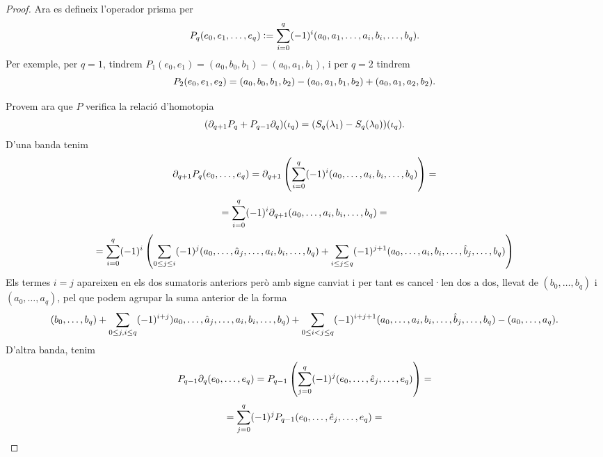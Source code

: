 \documentclass[../main.tex]{subfiles}
\begin{document}
\begin{proof}
Ara es defineix l'operador prisma per 
\begin{equation}
    \notag
    P_q(e_0,e_1,\ldots,e_q) := \sum_{i=0}^q(-1)^{i}(a_0,a_1,\ldots,a_i,b_i,\ldots,b_q).
\end{equation}
Per exemple, per $q = 1$, tindrem $P_1(e_0,e_1) = (a_0,b_0,b_1)-(a_0,a_1,b_1)$, i per $q = 2$ tindrem
\begin{equation}
    \notag
    P_2(e_0,e_1,e_2) = (a_0,b_0,b_1,b_2)-(a_0,a_1,b_1,b_2)+(a_0,a_1,a_2,b_2).
\end{equation}

Provem ara que $P$ verifica la relació d'homotopia
\begin{equation}
    \notag
    (\partial_{q+1}P_q+P_{q-1}\partial_q)(\iota_q)=(S_q(\lambda_1)-S_q(\lambda_0))(\iota_q).   
\end{equation}
D'una banda tenim
\begin{equation}
    \notag
    \partial_{q+1}P_q(e_0,\ldots,e_q) = \partial_{q+1}\left(\sum_{i=0}^q(-1)^{i}(a_0,\ldots,a_i,b_i,\ldots,b_q)\right) = 
\end{equation}
\begin{equation}
    \notag
    = \sum_{i=0}^q(-1)^{i}\partial_{q+1}(a_0,\ldots,a_i,b_i,\ldots,b_q) = 
\end{equation}
\begin{equation}
    \notag
    = \sum_{i=0}^q(-1)^{i}\left(\sum_{0\leq j\leq i}(-1)^j(a_0,\ldots,\hat{a}_j,\ldots,a_i,b_i,\ldots,b_q)+\sum_{i\leq j\leq q}(-1)^{j+1}(a_0,\ldots,a_i,b_i,\ldots,\hat{b}_j,\ldots,b_q)\right)    
\end{equation}
Els termes $i = j$ apareixen en els dos sumatoris anteriors però amb signe canviat i per tant es cancel·len dos a dos, llevat de $(b_0,\ldots,b_q)$ i $(a_0,\ldots,a_q)$, pel que podem agrupar la suma anterior de la forma
\begin{equation}
    \notag
    (b_0,\ldots,b_q)+\sum_{0\leq j,i\leq q}(-1)^{i+j})a_0,\ldots,\hat{a}_j,\ldots,a_i,b_i,\ldots,b_q)+\sum_{0\leq i<j\leq q}(-1)^{i+j+1}(a_0,\ldots,a_i,b_i,\ldots,\hat{b}_j,\ldots,b_q)-(a_0,\ldots,a_q).
\end{equation}
D'altra banda, tenim
\begin{equation}
    \notag
    P_{q-1}\partial_q(e_0,\ldots,e_q) = P_{q-1}\left(\sum_{j=0}^q(-1)^j(e_0,\ldots,\hat{e}_j,\ldots,e_q)\right) = 
\end{equation}
\begin{equation}
    \notag
    = \sum_{j=0}^q(-1)^jP_{q-1}(e_0,\ldots,\hat{e}_j,\ldots,e_q) = 
\end{equation}

\end{proof}
\end{document}
